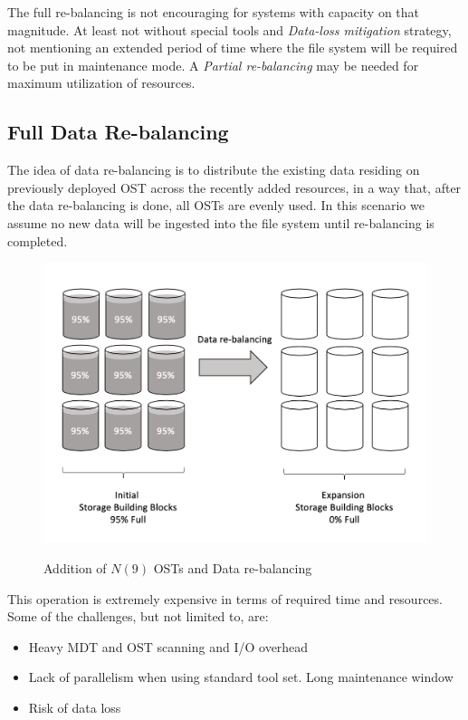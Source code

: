 \documentclass{article}
\begin{document}
The full re-balancing is not encouraging for systems with capacity on that magnitude. At least not without special tools and \textit{Data-loss mitigation} strategy, not mentioning an extended period of time where the file system will be required to be put in maintenance mode. A \textit{Partial re-balancing} may be needed for maximum utilization of resources.

\subsection{Full Data Re-balancing}
The idea of data re-balancing is to distribute the existing data residing on previously deployed OST across the recently added resources, in a way that, after the data re-balancing is done, all OSTs are evenly used. In this scenario we assume no new data will be ingested into the file system until re-balancing is completed.

\begin{figure}[h]
    \centering
    \includegraphics[scale=0.37]{full-rebalance.png}\\[0.5cm] 
    \caption{Addition of $N (9)$ OSTs and Data re-balancing}
    \label{fig:full-rebalance strategy}
\end{figure}


This operation is extremely expensive in terms of required time and resources. Some of the challenges, but not limited to, are: 
\begin{itemize}
    \item Heavy MDT and OST scanning and I/O overhead
    \item Lack of parallelism when using standard tool set. Long maintenance window
    \item Risk of data loss
\end{itemize}
\end{document}
